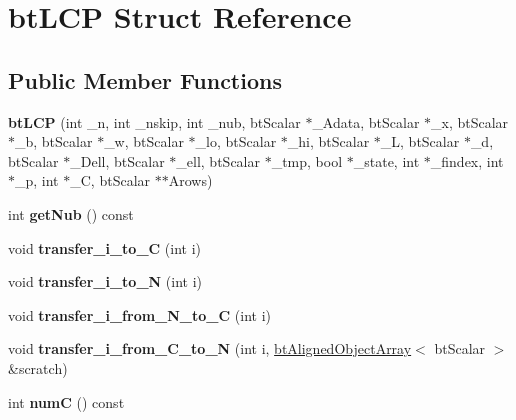 \hypertarget{structbtLCP}{}\section{bt\+L\+CP Struct Reference}
\label{structbtLCP}
\subsection*{Public Member Functions}
\begin{DoxyCompactItemize}
\item 
\mbox{\label{structbtLCP_a3b93bdc126485234ed4b25b3c43cbe3b}} 
{\bfseries bt\+L\+CP} (int \+\_\+n, int \+\_\+nskip, int \+\_\+nub, bt\+Scalar $\ast$\+\_\+\+Adata, bt\+Scalar $\ast$\+\_\+x, bt\+Scalar $\ast$\+\_\+b, bt\+Scalar $\ast$\+\_\+w, bt\+Scalar $\ast$\+\_\+lo, bt\+Scalar $\ast$\+\_\+hi, bt\+Scalar $\ast$\+\_\+L, bt\+Scalar $\ast$\+\_\+d, bt\+Scalar $\ast$\+\_\+\+Dell, bt\+Scalar $\ast$\+\_\+ell, bt\+Scalar $\ast$\+\_\+tmp, bool $\ast$\+\_\+state, int $\ast$\+\_\+findex, int $\ast$\+\_\+p, int $\ast$\+\_\+C, bt\+Scalar $\ast$$\ast$Arows)
\item 
\mbox{\label{structbtLCP_a4e1142b9bc604967db46c2fa26c53b19}} 
int {\bfseries get\+Nub} () const
\item 
\mbox{\label{structbtLCP_abb2bd986398389b62d9428642e157d3d}} 
void {\bfseries transfer\+\_\+i\+\_\+to\+\_\+C} (int i)
\item 
\mbox{\label{structbtLCP_a6078eafa2e4e2c1687cec0393ecca84b}} 
void {\bfseries transfer\+\_\+i\+\_\+to\+\_\+N} (int i)
\item 
\mbox{\label{structbtLCP_a799932d89b0afff17e1620aec228fe3a}} 
void {\bfseries transfer\+\_\+i\+\_\+from\+\_\+\+N\+\_\+to\+\_\+C} (int i)
\item 
\mbox{\label{structbtLCP_af1ecdf66b5febdba9333b1645dce328a}} 
void {\bfseries transfer\+\_\+i\+\_\+from\+\_\+\+C\+\_\+to\+\_\+N} (int i, \hyperlink{classbtAlignedObjectArray}{bt\+Aligned\+Object\+Array}$<$ bt\+Scalar $>$ \&scratch)
\item 
\mbox{\label{structbtLCP_aa7b6c15a85e7106505f55bbadf4d2dd9}} 
int {\bfseries numC} () const
$$
\end{DoxyCompactItemize}
